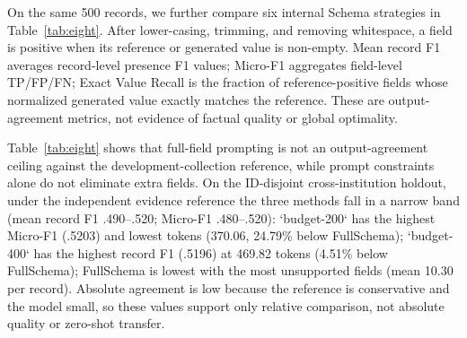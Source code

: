 \documentclass[runningheads]{llncs}
\newcommand{\full}{FullSchema}
\begin{document}
 On the same 500 records, we further compare six internal Schema strategies in Table~\ref{tab:eight}. After lower-casing, trimming, and removing whitespace, a field is positive when its reference or generated value is non-empty. Mean record F1 averages record-level presence F1 values; Micro-F1 aggregates field-level TP/FP/FN; Exact Value Recall is the fraction of reference-positive fields whose normalized generated value exactly matches the reference. These are output-agreement metrics, not evidence of factual quality or global optimality.

\begin{table}[htbp]
\centering
\scriptsize
\setlength{\tabcolsep}{2pt}
\caption{Output agreement, field coverage, and LLM tokens per record on 500 frozen records. Agreement is against the model-assisted reference, not factual Gold. `prompt-omit` was rerun; 23/500 raw responses with an unambiguous missing JSON value were repaired offline as `null` without new model calls, so this row is not a timing comparator.}
\label{tab:eight}
\end{table}

 Table~\ref{tab:eight} shows that full-field prompting is not an output-agreement ceiling against the development-collection reference, while prompt constraints alone do not eliminate extra fields. On the ID-disjoint cross-institution holdout, under the independent evidence reference the three methods fall in a narrow band (mean record F1 .490--.520; Micro-F1 .480--.520): `budget-200` has the highest Micro-F1 (.5203) and lowest tokens (370.06, 24.79\% below \full{}); `budget-400` has the highest record F1 (.5196) at 469.82 tokens (4.51\% below \full{}); \full{} is lowest with the most unsupported fields (mean 10.30 per record). Absolute agreement is low because the reference is conservative and the model small, so these values support only relative comparison, not absolute quality or zero-shot transfer.
\end{document}
